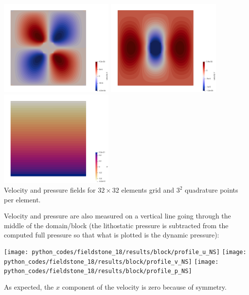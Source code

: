 \begin{center}
\includegraphics[width=5.7cm]{python_codes/fieldstone_18/results/block/NS/u}
\includegraphics[width=5.7cm]{python_codes/fieldstone_18/results/block/NS/v}
\includegraphics[width=5.7cm]{python_codes/fieldstone_18/results/block/NS/p}\\
{\captionfont Velocity and pressure fields for $32\times 32$ elements grid and $3^2$
quadrature points per element.}
\end{center}

Velocity and pressure are also measured on a vertical line going through
the middle of the domain/block (the lithostatic pressure is 
subtracted from the computed full pressure so that what is plotted is the 
dynamic pressure):
\begin{center}
\texttt{[image: python\_codes/fieldstone\_18/results/block/profile\_u\_NS]}
\texttt{[image: python\_codes/fieldstone\_18/results/block/profile\_v\_NS]}
\texttt{[image: python\_codes/fieldstone\_18/results/block/profile\_p\_NS]}
\end{center}
As expected, the $x$ component of the velocity is zero because of symmetry.


